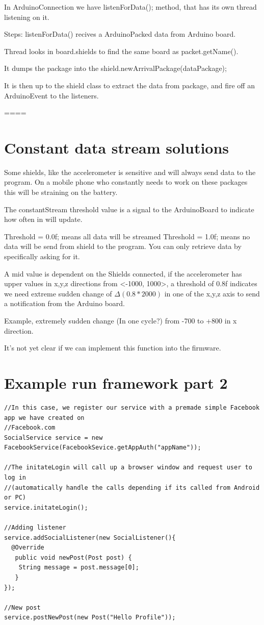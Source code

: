 In ArduinoConnection we have listenForData(); method, that has its own thread listening on it.

Steps:
listenForData() recives a ArduinoPacked data from Arduino board.

Thread looks in board.shields to find the same board as packet.getName().

It dumps the package into the shield.newArrivalPackage(dataPackage);

It is then up to the shield class to extract the data from package, and fire off an ArduinoEvent to the listeners.

====


\section{Constant data stream solutions}

Some shields, like the accelerometer is sensitive and will always send data to the program. On a mobile phone who constantly needs to work on these packages this will be straining on the battery.

The constantStream threshold value is a signal to the ArduinoBoard to indicate how often in will update.

Threshold = 0.0f; means all data will be streamed
Threshold = 1.0f; means no data will be send from shield to the program. You can only retrieve data by specifically asking for it.

A mid value is dependent on the Shields connected, if the accelerometer has upper values in x,y,z directions from <-1000, 1000>, a threshold of 0.8f indicates we need extreme sudden change of $\Delta(0.8*2000)$ in one of the x,y,z axis to send a notification from the Arduino board.

Example, extremely sudden change (In one cycle?) from -700 to +800 in x direction.  

It's not yet clear if we can implement this function into the firmware.

\section{Example run framework part 2}

\javacode
\begin{lstlisting}
//In this case, we register our service with a premade simple Facebook app we have created on
//Facebook.com
SocialService service = new FacebookService(FacebookSevice.getAppAuth("appName"));

//The initateLogin will call up a browser window and request user to log in
//(automatically handle the calls depending if its called from Android or PC)
service.initateLogin();

//Adding listener
service.addSocialListener(new SocialListener(){
  @Override
   public void newPost(Post post) {
    String message = post.message[0];
   }
});

//New post
service.postNewPost(new Post("Hello Profile"));
\end{lstlisting}
